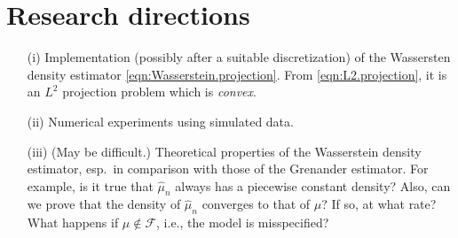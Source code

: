 \documentclass{article}
\newcommand{\cF}{\mathcal{F}}
\numberwithin{equation}{section}
\begin{document}
\section{Research directions}
\begin{itemize}
\item[(i)] Implementation (possibly after a suitable discretization) of the Wassersten density estimator \eqref{eqn:Wasserstein.projection}. From \eqref{eqn:L2.projection}, it is an $L^2$ projection problem which is {\it convex}.
\item[(ii)] Numerical experiments using simulated data.
\item[(iii)] (May be difficult.) Theoretical properties of the Wasserstein density estimator, esp.~in comparison with those of the Grenander estimator. For example, is it true that $\hat{\mu}_n$ always has a piecewise constant density? Also, can we prove that the density of $\hat{\mu}_n$ converges to that of $\mu$? If so, at what rate? What happens if $\mu \notin \cF$, i.e., the model is misspecified?
\end{itemize}




 
\end{document}
